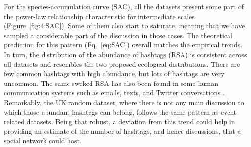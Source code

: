 For the species-accumulation curve (SAC), all the datasets present some part of the power-law relationship characteristic for intermediate scales (Figure~\ref{fig:4:SAC}). Some of them also start to saturate, meaning that we have sampled a considerable part of the discussion in those cases. The theoretical prediction for this pattern (Eq.~\ref{eq:SAC}) overall matches the empirical trends.\\


 In turn, the distribution of the abundance of hashtags (RSA) is consistent across all datasets and resembles the two proposed ecological distributions. There are few common hashtags with high abundance, but lots of hashtags are very uncommon. The same sweked RSA has also been found in some human communication systems such as emails, texts, and Twitter conversations \cite{tovo2021upscaling}. \\
 
 Remarkably, the UK random dataset, where there is not any main discussion to which those abundant hashtags can belong,  follows the same pattern as event-related datasets. Being that robust, a deviation from this trend could help in providing an estimate of the number of hashtags, and hence discussions, that a social network could host. \\


